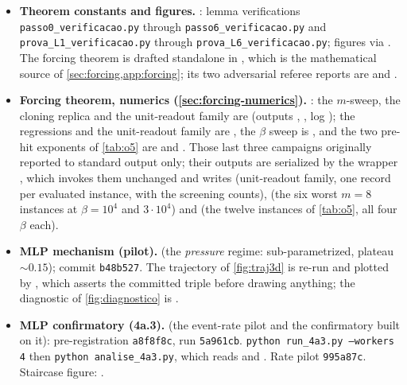 \documentclass[11pt]{article}
\theoremstyle{definition}
\theoremstyle{remark}
\begin{document}
{\sloppy
\begin{itemize}
\item \textbf{Theorem constants and figures.} : lemma
verifications \texttt{passo0\_verificacao.py} through
\texttt{passo6\_verificacao.py} and \texttt{prova\_L1\_verificacao.py}
through \texttt{prova\_L6\_verificacao.py}; figures via
. The forcing theorem is drafted standalone in
, which is the mathematical
source of \cref{sec:forcing,app:forcing}; its two adversarial referee reports
are  and
.
\item \textbf{Forcing theorem, numerics (\cref{sec:forcing-numerics}).}
: the $m$-sweep, the cloning replica and
the unit-readout family are  (outputs
, , log );
the regressions and the unit-readout family are , the $\beta$
sweep is , and the two pre-hit exponents of \cref{tab:o5} are
 and . Those last three campaigns
originally reported to standard output only; their outputs are serialized by the
wrapper , which invokes them unchanged and writes
 (unit-readout family, one record per evaluated
instance, with the screening counts),  (the six worst
$m=8$ instances at $\beta=10^4$ and $3\cdot10^4$) and 
(the twelve instances of \cref{tab:o5}, all four $\beta$ each).
\item \textbf{MLP mechanism (pilot).}
 (the \emph{pressure} regime:
sub-parametrized, plateau $\sim0.15$); commit \texttt{b48b527}. The trajectory of
\cref{fig:traj3d} is re-run and plotted by
, which asserts the committed
triple before drawing anything; the diagnostic of \cref{fig:diagnostico} is
.
\item \textbf{MLP confirmatory (4a.3).}  (the
event-rate pilot and the confirmatory built on it): pre-registration
\texttt{a8f8f8c}, run \texttt{5a961cb}.
\texttt{python run\_4a3.py --workers 4} then \texttt{python analise\_4a3.py},
which reads  and . Rate pilot
\texttt{995a87c}. Staircase figure: .

\end{itemize}}
\end{document}
